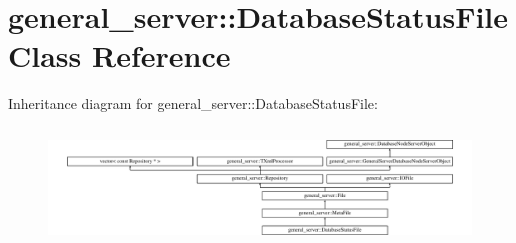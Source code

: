 \hypertarget{classgeneral__server_1_1DatabaseStatusFile}{\section{general\-\_\-server\-:\-:\-Database\-Status\-File \-Class \-Reference}
\label{classgeneral__server_1_1DatabaseStatusFile}
}
\-Inheritance diagram for general\-\_\-server\-:\-:\-Database\-Status\-File\-:\begin{figure}[H]
\begin{center}
\leavevmode
\includegraphics[height=3.146067cm]{classgeneral__server_1_1DatabaseStatusFile}
\end{center}
\end{figure}

